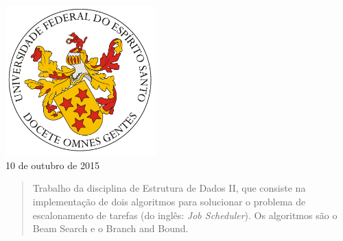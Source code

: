 \documentclass[a4paper,12pt]{article}
\begin{document}
\begin{titlepage}


\includegraphics[width=58mm]{LogoUfes.png}\\[1cm] %


{\large 10 de outubro de 2015}\\[2cm] %

\vfill %

\end{titlepage}





\begin{abstract}
Trabalho da disciplina de Estrutura de Dados II, que consiste na implementação 
de dois algoritmos para solucionar o problema de escalonamento de tarefas (do inglês: \textit{Job Scheduler}). Os 
algoritmos são o Beam Search e o Branch and Bound.
\end{abstract}

\newpage
\end{document}
